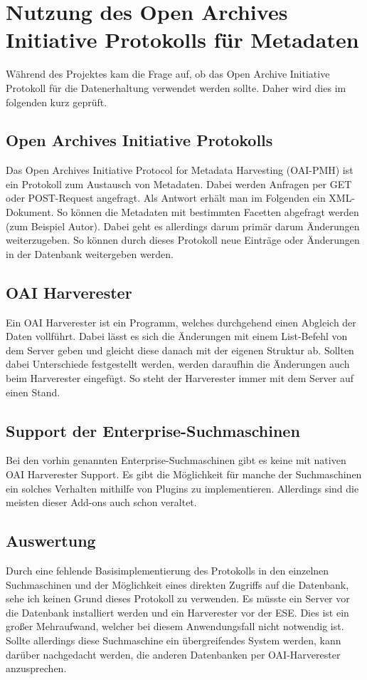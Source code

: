 \chapter{Nutzung des Open Archives Initiative Protokolls für Metadaten}

Während des Projektes kam die Frage auf, ob das Open Archive Initiative Protokoll für die Datenerhaltung verwendet werden sollte. Daher wird dies im folgenden kurz geprüft.


\section{Open Archives Initiative Protokolls}

Das Open Archives Initiative Protocol for Metadata Harvesting (OAI-PMH) ist ein Protokoll zum Austausch von Metadaten. Dabei werden Anfragen per GET oder POST-Request angefragt. Als Antwort erhält man im Folgenden ein XML-Dokument. So können die Metadaten mit bestimmten Facetten abgefragt werden (zum Beispiel Autor). Dabei geht es allerdings darum primär darum Änderungen weiterzugeben. So können durch dieses Protokoll neue Einträge oder Änderungen in der Datenbank weitergeben werden.
\cite{DeutscheNationalBibliothek.2019}

\section{OAI Harverester}

Ein OAI Harverester ist ein Programm, welches durchgehend einen Abgleich der Daten vollführt. Dabei lässt es sich die Änderungen mit einem List-Befehl von dem Server geben und gleicht diese danach mit der eigenen Struktur ab. Sollten dabei Unterschiede festgestellt werden, werden daraufhin die Änderungen auch beim Harverester eingefügt. So steht der Harverester immer mit dem Server auf einen Stand.
\cite{DeutscheNationalBibliothek.2019}

\section{Support der Enterprise-Suchmaschinen}

Bei den vorhin genannten Enterprise-Suchmaschinen gibt es keine mit nativen OAI Harverester Support. Es gibt die Möglichkeit für manche der Suchmaschinen ein solches Verhalten mithilfe von Plugins zu implementieren. Allerdings sind die meisten dieser Add-ons auch schon veraltet.

\section{Auswertung}

Durch eine fehlende Basisimplementierung des Protokolls in den einzelnen Suchmaschinen und der Möglichkeit eines direkten Zugriffs auf die Datenbank, sehe ich keinen Grund dieses Protokoll zu verwenden. Es müsste ein Server vor die Datenbank installiert werden und ein Harverester vor der ESE. Dies ist ein großer Mehraufwand, welcher bei diesem Anwendungsfall nicht notwendig ist. Sollte allerdings diese Suchmaschine ein übergreifendes System werden, kann darüber nachgedacht werden, die anderen Datenbanken per OAI-Harverester anzusprechen.